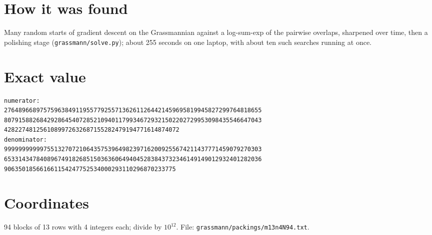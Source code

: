 \documentclass[11pt,a4paper]{article}
\begin{document}
\section{How it was found}
Many random starts of gradient descent on the Grassmannian against a log-sum-exp of the pairwise overlaps, sharpened over time, then a polishing stage (\texttt{grassmann/solve.py}); about 255 seconds on one laptop, with about ten such searches running at once.


\appendix
\section{Exact value}
{\small
\begin{verbatim}
numerator:
276489668975759638491195577925571362611264421459695819945827299764818655
807915882684292864540728521094011799346729321502202729953098435546647043
4282274812561089972632687155282479194771614874072
denominator:
999999999997551327072106435753964982397162009255674211437771459079270303
653314347840896749182685150363606494045283843732346149149012932401282036
906350185661661154247752534000293110296870233775
\end{verbatim}}

\section{Coordinates}
94 blocks of 13 rows with 4 integers each; divide by $10^{12}$. File: \texttt{grassmann/packings/m13n4N94.txt}.
{\tiny
\begin{multicols}{3}
\end{multicols}}
\end{document}

